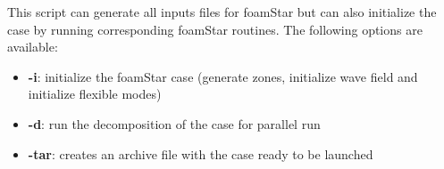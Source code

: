 This script can generate all inputs files for foamStar but can also initialize the case by running corresponding foamStar routines. The following options are available:
\begin{itemize}
\item \textbf{-i}: initialize the foamStar case (generate zones, initialize wave field and initialize flexible modes)
\item \textbf{-d}: run the decomposition of the case for parallel run
\item \textbf{-tar}: creates an archive file with the case ready to be launched
\end{itemize}
